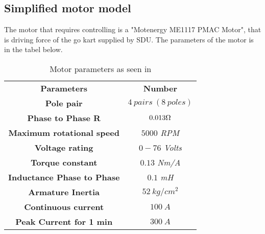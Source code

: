 \subsection{Simplified motor model}
The motor that requires controlling is a "Motenergy ME1117 PMAC Motor", that is driving force of the go kart supplied by SDU. The parameters of the motor is in the tabel below.

\begin{table}
\centering
\begin{tabular}{|c|c|} \cline{1-2}
\textbf{Parameters} & \textbf{Number} \\ \cline{1-2}
\textbf{Pole pair} & $4\ pairs\ (8\ poles)$ \\ \cline{1-2}
\textbf{Phase to Phase R} & $0.013\ohm$ \\ \cline{1-2}
\textbf{Maximum rotational speed} & $5000$ \textit{RPM} \\ \cline{1-2}
\textbf{Voltage rating} & $0-76$ \textit{Volts} \\ \cline{1-2}
\textbf{Torque constant} & $0.13$ \textit{Nm/A} \\ \cline{1-2}
\textbf{Inductance Phase to Phase} & $0.1$ \textit{mH} \\ \cline{1-2}
\textbf{Armature Inertia} & $52\ kg/cm^2$ \\ \cline{1-2}
\textbf{Continuous current} & $100\ A$ \\ \cline{1-2}
\textbf{Peak Current for 1 min} & $300\ A$ \\ \cline{1-2}  
\end{tabular} \\
\caption{Motor parameters as seen in \cite{Motor_Parameters}}
\label{Motor_parameters_list}
\end{table}

